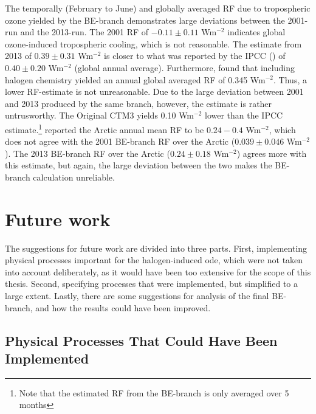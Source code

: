 The temporally (February to June) and globally averaged RF due to tropospheric ozone yielded by the BE-branch demonstrates large deviations between the 2001-run and the 2013-run. The 2001 RF of $-0.11\pm0.11$ Wm$^{-2}$ indicates global ozone-induced tropospheric cooling, which is not reasonable. The estimate from 2013 of $0.39\pm0.31$ Wm$^{-2}$ is closer to what was reported by the IPCC (\cite{IPCCchapter8}) of $0.40\pm0.20$ Wm$^{-2}$ (global annual average). Furthermore, \cite{Sherwen2017} found that including halogen chemistry yielded an annual global averaged RF of 0.345  Wm$^{-2}$. Thus, a lower RF-estimate is not unreasonable. Due to the large deviation between 2001 and 2013 produced by the same branch, however, the estimate is rather untrusworthy. The Original CTM3 yields 0.10 Wm$^{-2}$ lower than the IPCC estimate.\footnote{Note that the estimated RF from the BE-branch is only averaged over 5 months} \cite{shindell2003} reported the Arctic annual mean RF to be $0.24-0.4$ Wm$^{-2}$, which does not agree with the 2001 BE-branch RF over the Arctic ($0.039\pm0.046$ Wm$^{-2}$). The 2013 BE-branch RF over the Arctic ($0.24\pm0.18$ Wm$^{-2}$) agrees more with this estimate, but again, the large deviation between the two makes the BE-branch calculation unreliable.  


\section{Future work}

The suggestions for future work are divided into three parts. First, implementing physical processes important for the halogen-induced \acrfull{ode}, which were not taken into account deliberately, as it would have been too extensive for the scope of this thesis. Second, specifying processes that were implemented, but simplified to a large extent. Lastly, there are some suggestions for analysis of the final BE-branch, and how the results could have been improved.

\subsection{Physical Processes That Could Have Been Implemented}

